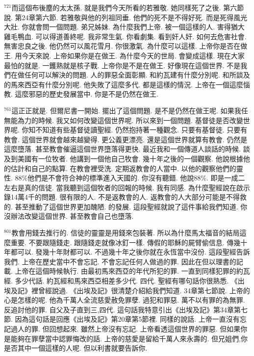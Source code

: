 \documentclass{book}
\begin{document}
$^{721}$而這個布後塵的太太孫.
就是我們今天所看的若雅敬.
她同樣死了之後.
第六節說.
第24章第六節.
若雅敬與他的列祖同垂.
他們的死不是不得好死.
而是死得風光大壯.
你就會問一個問題.
弟兄姊妹.
為什麼我們上帝.
被一個這樣的人.
害得猶大雞毛鴨血.
可以得道善終呢.
我非常生氣.
你看劇集.
看到奸人奸.
如何去危害社會.
無害忠良之後.
他仍然可以風花雪月.
你很激氣.
為什麼可以這樣.
上帝你是否在做王.
用今天來說.
上帝如果你是在做王.
為什麼今天的世局.
會變成這樣.
現在大家最怕的就是.
一鑊熟就是核子戰.
上帝你是不是在做王.
好像現在這個世界.
不是我們在做任何可以解決的問題.
人的罪惡全面彰顯.
和約瓦建有什麼分別呢.
和所談及的馬來西亞有什麼分別呢.
他失敗了這麼多代.
都是這樣的情況.
上帝在一個這麼惱教.
這麼邪惡的歷史發展當中.
你是不是仍然在做王.

$^{761}$這正正就是.
但爾尼書一開始.
擺出了這個問題.
是不是仍然在做王呢.
如果我任無能為力的時候.
我又如何改變這個世界呢.
所以來到一個問題.
基督徒是否改變世界呢.
你知不知道有些基督徒讀聖經.
仍然抱持著一種觀念.
只要有基督徒.
只要有教會.
這個世界就會越來越變得.
更公義更漂亮.
還是這個世界就算有教會.
仍然是這麼墮落.
甚至教會催逼這個世界墮落得更快.
最近我和一個傳道人談話的時候.
談及到美國有一位牧者.
他講到一個他自己牧會.
幾十年之後的一個觀察.
他說根據他的估計和自己的點算.
在教會裡受洗.
定期返教會的人當中.
以他的觀察他們的靈性.
88\%他們是不會符合神的標準進入天國的.
你沒有聽錯.
他說88\%.
即是一成二左右是真的信徒.
當我聽到這個牧者的回報的時候.
我有同感.
為什麼聖經說在啟示錄14萬4千的問題.
很有限的人.
不是返教會的人.
返教會的人大部分可能是不得救的.
甚至推動了這個世界更加醜陋.
的發展.
這段聖經就說了這件事給我們知道.
你沒辦法改變這個世界.
甚至教會自己也墮落.

$^{801}$教會用錢去推行的.
信徒的靈靈是用錢來包裝著.
所以為什麼馬太福音的結局這麼重要.
不要跟隨錢走.
跟隨錢走就像冰釘一樣.
傳假的耶穌的屍臂偷信息.
傳幾十年都可以.
發幾十年財都可以.
不過幾十年之後你就在永恆當中沒份.
這段聖經告訴我們.
上帝在歷史當中不會忘記.
不會忘記任何人做過的罪.
因此在但以理書的記載.
上帝在這個時候執行.
由最初馬來西亞的年代所犯的罪.
一直到同樣犯罪的約瓦經.
多少代話.
約瓦經和馬來西亞相差多少代.
四代.
聖經有哪句話你很熟悉.
《出埃及記》裡曾經說過.
《出埃及記》很清楚介紹給我們知道.
34章第七節說.
上帝的心是怎樣的呢.
他為千萬人全流慈愛赦免罪孽.
過犯和罪惡.
萬不以有罪的為無罪.
反追討他的罪.
自父及子直到三,四代.
這句話我特意引出《出埃及記》第34章第七節.
因為這句話是回應《出埃及記》第20章第5節裡.
同樣的說話.
上帝一直沒有忘記過人的罪.
但回想起來.
雖然上帝沒有忘記.
上帝看透這個世界的罪惡.
但如果你是能夠在罪孽當中認罪悔改的話.
上帝的慈愛是留給千萬人來永壽的.
但兄姐們,你是否其中一個這樣的人呢.
但以利書就要告訴你.
\end{document}
